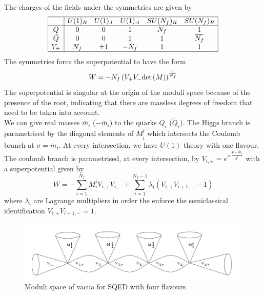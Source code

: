 The charges of the fields under the symmetries are given by
 \begin{equation}
 \begin{array}{ | c | c c c c c |}
 \hline
  & U(1)_R &  U(1)_J & U(1)_A & SU(N_f)_R & SU(N_f)_R \\
 \hline
 Q & 0 & 0  & 1 & N_f & 1  \\  
 \tilde{Q} & 0 & 0  & 1 & 1 & \overbar{N_f}  \\  
   V_{\pm} & N_f & \pm 1  & -N_f & 1  &  1\\
   \hline
 \end{array}
\end{equation}
The symmetries force the superpotential to have the form
\begin{equation}
W = - N_f \left(  V_+ V_- \mathrm{det } \,{ (M)} \right)^{\frac{1}{N_f}}
\label{eqn:moduli_space_u1_nfsuperpotential}
\end{equation}
The superpotential is singular at the origin of the moduli space because of the presence of the root, indicating that there are massless degrees of freedom that need to be taken into account.\\
We can give real masses $\bar{m}_i$ ($-\bar{m}_i$) to the quarks $Q_i$ ($\tilde{Q}_i$).
The Higgs branch is parametrised by the diagonal elements of $M^i_{\tilde{i}}$ which intersects the Coulomb branch at $\sigma = \bar{m}_i$.
At every intersection, we have $U(1)$ theory with one flavour.
The coulomb branch is parametrised, at every intersection, by $V_{i,\pm} = e^{\pm \frac{\Phi - \bar{m}_i}{g^2}} $ with a superpotential given by
\begin{equation}
W = - \sum_{i = 1}^{N_f} M^i_i V_{i,+} V_{i,-} + \sum_{i=1}^{N_f - 1} \lambda_i \left(    V_{i,+} V_{i+1,-} - 1\right)
\end{equation}
where $\lambda_i$ are Lagrange multipliers in order the enforce the semiclassical identification  $ V_{i,+} V_{i+1,-} = 1 $.

\begin{figure}[h!]
\centering
\includegraphics[scale=0.5]{u1_moduli_space_flavours.png}
\caption{Moduli space of vacua for SQED with four flavours}
\end{figure}
















